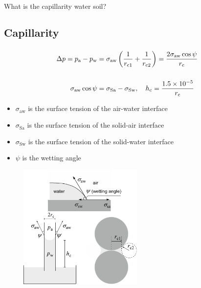 \begin{frame}
	\begin{center}\Huge
		What is the capillarity water soil?
	\end{center}
\end{frame}

\subsection{Capillarity}

\begin{frame}
	\frametitle{\subsecname}
	\begin{minipage}{0.5\textwidth}
		\begin{align*}
			\Delta p=p_{\mathrm{a}}-p_{\mathrm{w}} & =
			\sigma_{\mathrm{aw}}\left(\frac{1}{r_{\mathrm{c} 1}}+\frac{1}{r_{\mathrm{c} 2}}\right)
			=\frac{2 \sigma_{\mathrm{aw}} \cos \psi}{r_{\mathrm{c}}}                                  \\[\baselineskip]
			\sigma_{\mathrm{aw}}\cos\psi           & =\sigma_{\mathrm{Sa}}-\sigma_{\mathrm{Sw}},\quad
			h_{\mathrm{c}} =\frac{1.5 \times 10^{-5}}{r_{\mathrm{c}}}
		\end{align*}
		\begin{itemize}
			\item $\sigma_{\mathrm{aw}}$ is the surface tension of the air-water interface
			\item $\sigma_{\mathrm{Sa}}$ is the surface tension of the solid-air interface
			\item $\sigma_{\mathrm{Sw}}$ is the surface tension of the solid-water interface
			\item $\psi$ is the wetting angle
		\end{itemize}
	\end{minipage}
	\begin{minipage}{0.47\textwidth}
		\begin{figure}[ht!]
			\centering
			\includegraphics[height=6.2cm]{capillar_preassure}
		\end{figure}
	\end{minipage}
\end{frame}

